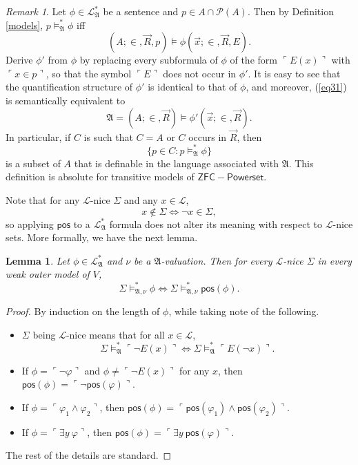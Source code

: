 \documentclass[12pt, twoside]{memoir}
\numberwithin{equation}{section}
\newtheorem{lem}[thm]{Lemma}
\theoremstyle{definition}
\theoremstyle{remark}
\newtheorem{rem}[thm]{Remark}
\theoremstyle{definition}
\theoremstyle{definition}
\theoremstyle{definition}
\theoremstyle{remark}
\begin{document}
\begin{rem}\label{def2}
Let $\phi \in \mathcal{L}^{*}_{\mathfrak{A}}$ be a sentence and $p \in A \cap \mathcal{P}(A)$. Then by Definition \ref{models}, $p \models^*_{\mathfrak{A}} \phi$ iff 
\begin{equation}\label{eq31}
    (A; \in, \Vec{R}, p) \models \phi(\Vec{x}; \in, \Vec{R}, E).
\end{equation}
Derive $\phi'$ from $\phi$ by replacing every subformula of $\phi$ of the form $\ulcorner E(x) \urcorner$ with $\ulcorner x \in p \urcorner$, so that the symbol $\ulcorner E \urcorner$ does not occur in $\phi'$. It is easy to see that the quantification structure of $\phi'$ is identical to that of $\phi$, and moreover, (\ref{eq31}) is semantically equivalent to $$\mathfrak{A} = (A; \in, \Vec{R}) \models \phi'(\Vec{x}; \in, \Vec{R}).$$ In particular, if $C$ is such that $C = A$ or $C$ occurs in $\Vec{R}$, then $$\{p \in C : p \models^*_{\mathfrak{A}} \phi\}$$ is a subset of $A$ that is definable in the language associated with $\mathfrak{A}$. This definition is absolute for transitive models of $\mathsf{ZFC - Powerset}$.
\end{rem}

Note that for any $\mathcal{L}$-nice $\Sigma$ and any $x \in \mathcal{L}$, $$x \not\in \Sigma \iff \neg x \in \Sigma,$$ so applying $\mathsf{pos}$ to a $\mathcal{L}^{*}_{\mathfrak{A}}$ formula does not alter its meaning with respect to $\mathcal{L}$-nice sets. More formally, we have the next lemma.

\begin{lem}\label{corr}
Let $\phi \in \mathcal{L}^{*}_{\mathfrak{A}}$ and $\nu$ be a $\mathfrak{A}$-valuation. Then for every $\mathcal{L}$-nice $\Sigma$ in every weak outer model of $V$, $$\Sigma \models^*_{\mathfrak{A}, \nu} \phi \iff \Sigma \models^*_{\mathfrak{A}, \nu} \mathsf{pos}(\phi).$$
\end{lem}

\begin{proof}
By induction on the length of $\phi$, while taking note of the following.
\begin{itemize}
    \item $\Sigma$ being $\mathcal{L}$-nice means that for all $x \in \mathcal{L}$, $$\Sigma \models^*_{\mathfrak{A}} \ulcorner \neg E(x) \urcorner \iff \Sigma \models^*_{\mathfrak{A}} \ulcorner E(\neg x) \urcorner.$$ 
    \item If $\phi = \ulcorner \neg \varphi \urcorner$ and $\phi \neq \ulcorner \neg E(x) \urcorner$ for any $x$, then $\mathsf{pos}(\phi) = \ulcorner \neg \mathsf{pos}(\varphi) \urcorner$.
    \item If $\phi = \ulcorner \varphi_1 \wedge \varphi_2 \urcorner$, then $\mathsf{pos}(\phi) = \ulcorner \mathsf{pos}(\varphi_1) \wedge \mathsf{pos}(\varphi_2) \urcorner$.
    \item If $\phi = \ulcorner \exists y \ \varphi \urcorner$, then $\mathsf{pos}(\phi) = \ulcorner \exists y \ \mathsf{pos}(\varphi) \urcorner$.
\end{itemize}
The rest of the details are standard.
\end{proof}
\end{document}
